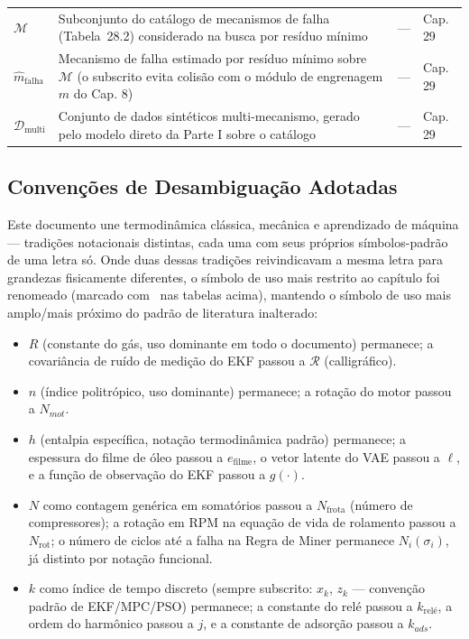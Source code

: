 \documentclass[12pt,a4paper]{article}
\numberwithin{equation}{section}
\numberwithin{table}{section}
\numberwithin{figure}{section}
\begin{document}
{{\begin{longtable}{>{\raggedright\arraybackslash}p{2.8cm} >{\raggedright\arraybackslash}p{5.3cm} >{\raggedright\arraybackslash}p{2.1cm} >{\raggedright\arraybackslash}p{4.2cm}}
	$\mathcal{M}$ & Subconjunto do catálogo de mecanismos de falha (Tabela~28.2) considerado na busca por resíduo mínimo & --- & Cap. 29 \\
	$\hat{m}_{\text{falha}}$\dag & Mecanismo de falha estimado por resíduo mínimo sobre $\mathcal{M}$ (o subscrito evita colisão com o módulo de engrenagem $m$ do Cap. 8) & --- & Cap. 29 \\
	$\mathcal{D}_{\text{multi}}$ & Conjunto de dados sintéticos multi-mecanismo, gerado pelo modelo direto da Parte I sobre o catálogo & --- & Cap. 29 \\ \bottomrule
\end{longtable}
}

\subsection*{Convenções de Desambiguação Adotadas}
Este documento une termodinâmica clássica, mecânica e aprendizado de máquina — tradições notacionais distintas, cada uma com seus próprios símbolos-padrão de uma letra só. Onde duas dessas tradições reivindicavam a mesma letra para grandezas fisicamente diferentes, o símbolo de uso mais restrito ao capítulo foi renomeado (marcado com \dag\ nas tabelas acima), mantendo o símbolo de uso mais amplo/mais próximo do padrão de literatura inalterado:
\begin{itemize}
	\item $R$ (constante do gás, uso dominante em todo o documento) permanece; a covariância de ruído de medição do EKF passou a $\mathcal{R}$ (calligráfico).
	\item $n$ (índice politrópico, uso dominante) permanece; a rotação do motor passou a $N_{mot}$.
	\item $h$ (entalpia específica, notação termodinâmica padrão) permanece; a espessura do filme de óleo passou a $e_{\text{filme}}$, o vetor latente do VAE passou a $\ell$, e a função de observação do EKF passou a $g(\cdot)$.
	\item $N$ como contagem genérica em somatórios passou a $N_{\text{frota}}$ (número de compressores); a rotação em RPM na equação de vida de rolamento passou a $N_{\text{rot}}$; o número de ciclos até a falha na Regra de Miner permanece $N_i(\sigma_i)$, já distinto por notação funcional.
	\item $k$ como índice de tempo discreto (sempre subscrito: $x_k$, $z_k$ — convenção padrão de EKF/MPC/PSO) permanece; a constante do relé passou a $k_{\text{relé}}$, a ordem do harmônico passou a $j$, e a constante de adsorção passou a $k_{ads}$.

\end{itemize}}
\end{document}

